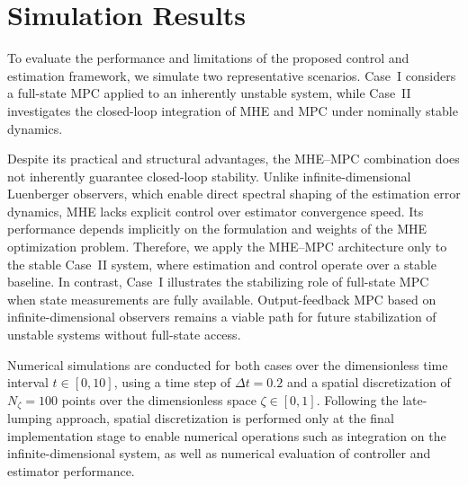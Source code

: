 \section{Simulation Results} \label{sec:6_results}



To evaluate the performance and limitations of the proposed control and estimation framework, we simulate two representative scenarios. Case~I considers a full-state MPC applied to an inherently unstable system, while Case~II investigates the closed-loop integration of MHE and MPC under nominally stable dynamics.

Despite its practical and structural advantages, the MHE--MPC combination does not inherently guarantee closed-loop stability. Unlike infinite-dimensional Luenberger observers, which enable direct spectral shaping of the estimation error dynamics, MHE lacks explicit control over estimator convergence speed. Its performance depends implicitly on the formulation and weights of the MHE optimization problem. Therefore, we apply the MHE--MPC architecture only to the stable Case~II system, where estimation and control operate over a stable baseline. In contrast, Case~I illustrates the stabilizing role of full-state MPC when state measurements are fully available. Output-feedback MPC based on infinite-dimensional observers remains a viable path for future stabilization of unstable systems without full-state access\autocite{Khatibi2021Model,Moadeli2025Observer}.

Numerical simulations are conducted for both cases over the dimensionless time interval $t \in [0, 10]$, using a time step of $\Delta t = 0.2$ and a spatial discretization of $N_\zeta = 100$ points over the dimensionless space $\zeta \in [0, 1]$. Following the late-lumping approach, spatial discretization is performed only at the final implementation stage to enable numerical operations such as integration on the infinite-dimensional system, as well as numerical evaluation of controller and estimator performance.

